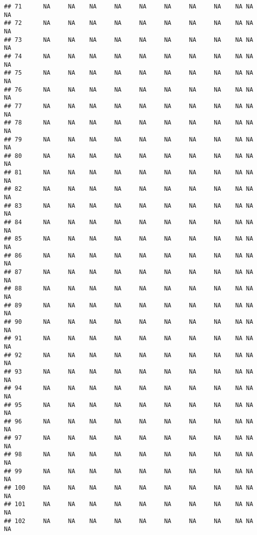 \documentclass[]{article}
\begin{document}
\begin{verbatim}
## 71      NA     NA    NA     NA     NA     NA     NA     NA    NA NA          NA
## 72      NA     NA    NA     NA     NA     NA     NA     NA    NA NA          NA
## 73      NA     NA    NA     NA     NA     NA     NA     NA    NA NA          NA
## 74      NA     NA    NA     NA     NA     NA     NA     NA    NA NA          NA
## 75      NA     NA    NA     NA     NA     NA     NA     NA    NA NA          NA
## 76      NA     NA    NA     NA     NA     NA     NA     NA    NA NA          NA
## 77      NA     NA    NA     NA     NA     NA     NA     NA    NA NA          NA
## 78      NA     NA    NA     NA     NA     NA     NA     NA    NA NA          NA
## 79      NA     NA    NA     NA     NA     NA     NA     NA    NA NA          NA
## 80      NA     NA    NA     NA     NA     NA     NA     NA    NA NA          NA
## 81      NA     NA    NA     NA     NA     NA     NA     NA    NA NA          NA
## 82      NA     NA    NA     NA     NA     NA     NA     NA    NA NA          NA
## 83      NA     NA    NA     NA     NA     NA     NA     NA    NA NA          NA
## 84      NA     NA    NA     NA     NA     NA     NA     NA    NA NA          NA
## 85      NA     NA    NA     NA     NA     NA     NA     NA    NA NA          NA
## 86      NA     NA    NA     NA     NA     NA     NA     NA    NA NA          NA
## 87      NA     NA    NA     NA     NA     NA     NA     NA    NA NA          NA
## 88      NA     NA    NA     NA     NA     NA     NA     NA    NA NA          NA
## 89      NA     NA    NA     NA     NA     NA     NA     NA    NA NA          NA
## 90      NA     NA    NA     NA     NA     NA     NA     NA    NA NA          NA
## 91      NA     NA    NA     NA     NA     NA     NA     NA    NA NA          NA
## 92      NA     NA    NA     NA     NA     NA     NA     NA    NA NA          NA
## 93      NA     NA    NA     NA     NA     NA     NA     NA    NA NA          NA
## 94      NA     NA    NA     NA     NA     NA     NA     NA    NA NA          NA
## 95      NA     NA    NA     NA     NA     NA     NA     NA    NA NA          NA
## 96      NA     NA    NA     NA     NA     NA     NA     NA    NA NA          NA
## 97      NA     NA    NA     NA     NA     NA     NA     NA    NA NA          NA
## 98      NA     NA    NA     NA     NA     NA     NA     NA    NA NA          NA
## 99      NA     NA    NA     NA     NA     NA     NA     NA    NA NA          NA
## 100     NA     NA    NA     NA     NA     NA     NA     NA    NA NA          NA
## 101     NA     NA    NA     NA     NA     NA     NA     NA    NA NA          NA
## 102     NA     NA    NA     NA     NA     NA     NA     NA    NA NA          NA

\end{verbatim}
\end{document}
